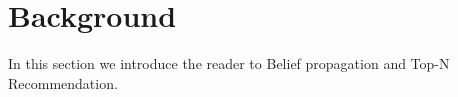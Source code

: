 \section{Background}\label{sec:background}

In this section we introduce the reader to Belief propagation and Top-N Recommendation.

